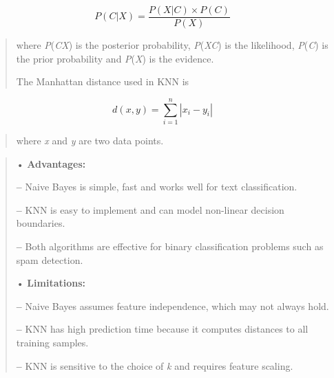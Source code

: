 \documentclass[
]{article}
\begin{document}
\[P(C|X) = \frac{P(X|C) \times P(C)}{P(X)}\]

\begin{quote}
where \emph{P}(\emph{C\textbar X}) is the posterior probability,
\emph{P}(\emph{X\textbar C}) is the likelihood, \emph{P}(\emph{C}) is
the prior probability and \emph{P}(\emph{X}) is the evidence.

The Manhattan distance used in KNN is
\end{quote}

\[d(x, y) = \sum_{i=1}^{n} |x_i - y_i|\]

\begin{quote}
where \emph{x} and \emph{y} are two data points.
\end{quote}

\begin{quote}
• \textbf{Advantages:}

\textbf{--} Naive Bayes is simple, fast and works well for text
classification.

\textbf{--} KNN is easy to implement and can model non-linear decision
boundaries.

\textbf{--} Both algorithms are effective for binary classification
problems such as spam detection.

• \textbf{Limitations:}

\textbf{--} Naive Bayes assumes feature independence, which may not
always hold.

\textbf{--} KNN has high prediction time because it computes distances
to all training samples.

\textbf{--} KNN is sensitive to the choice of \emph{k} and requires
feature scaling.
\end{quote}
\end{document}
